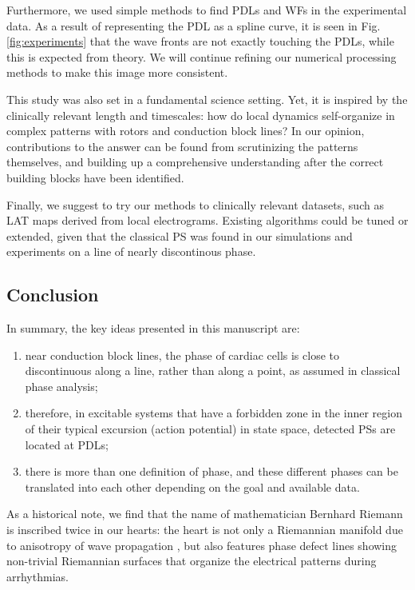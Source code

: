 \documentclass{article}
\begin{document}
Furthermore, we used simple methods to find PDLs and WFs in the experimental data. As a result of representing the PDL as a spline curve, it is seen in Fig. \ref{fig:experiments} that the wave fronts are not exactly touching the PDLs, while this is expected from theory. We will continue refining our numerical processing methods to make this image more consistent. 

This study was also set in a fundamental science setting. Yet, it is inspired by the clinically relevant length and timescales: how do local dynamics self-organize in complex patterns with rotors and conduction block lines? In our opinion, contributions to the answer can be found from scrutinizing the patterns themselves, and building up a comprehensive understanding after the correct building blocks have been identified. 

Finally, we suggest to try our methods to clinically relevant datasets, such as LAT maps derived from local electrograms. Existing algorithms could be tuned or extended, given that the classical PS was found in our simulations and experiments on a line of nearly discontinous phase. 

\subsection{Conclusion}
In summary, the key ideas presented in this manuscript are:
\begin{enumerate}
\item near conduction block lines, the phase of cardiac cells is close to discontinuous along a line, rather than along a point, as assumed in classical phase analysis; 
\item therefore, in excitable systems that have a forbidden zone in the inner region of their typical excursion (action potential) in state space, detected PSs are located at PDLs;
    \item there is more than one definition of phase, and these different phases can be translated into each other depending on the goal and available data. 
\end{enumerate}

As a historical note, we find that the name of mathematician Bernhard Riemann is inscribed twice in our hearts: the heart is not only a Riemannian manifold due to anisotropy of wave propagation \citep{Wellner:2002,Verschelde:2007,Young:2010}, but also features phase defect lines showing non-trivial Riemannian surfaces that organize the electrical patterns during arrhythmias.
\end{document}
